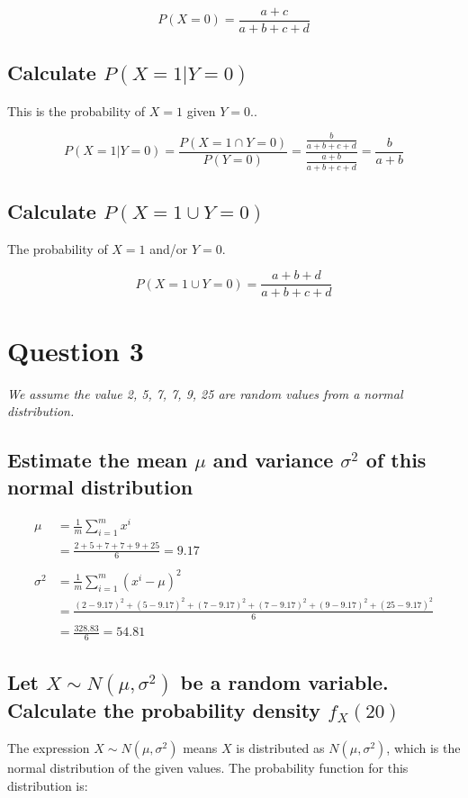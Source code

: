 \documentclass{article}
\begin{document}
	\begin{equation*}
	P(X=0) = \frac{a + c}{a+b+c+d}
	\end{equation*}
	
\subsection{Calculate $P(X=1|Y=0)$}
This is the probability of $X=1$ given $Y=0$..
	
	\begin{equation*}
	P(X=1|Y=0) = \frac{P(X=1 \cap Y=0)}{P(Y=0)}= \frac{\frac{b}{a+b+c+d}}{\frac{a+b}{a+b+c+d}} = \frac{b}{a+b}
	\end{equation*}
	
\subsection{Calculate $P(X=1 \cup Y=0)$}
The probability of $X=1$ and/or $Y=0$.

	\begin{equation*}
	P(X=1 \cup Y=0) = \frac{a+b+d}{a+b+c+d}
	\end{equation*}

\pagebreak
\section{Question 3}
\textit{We assume the value 2, 5, 7, 7, 9, 25 are random values from a normal distribution.}

\subsection{Estimate the mean $\mu$ and variance $\sigma^2$ of this normal distribution}
	
	\begin{align*}
	\mu &= \frac{1}{m}\sum\limits_{i=1}^m x^i \\
	 &= \frac{2+5+7+7+9+25}{6} = 9.17 \\ \\
	\sigma^2 &= \frac{1}{m}\sum\limits_{i=1}^m(x^i-\mu)^2\\
	&= \frac{(2-9.17)^2 + (5-9.17)^2 + (7-9.17)^2 + (7-9.17)^2 + (9-9.17)^2 + (25-9.17)^2}{6}\\
	&= \frac{328.83}{6} = 54.81
	\end{align*}

\subsection{Let $X \sim N(\mu,\sigma^2)$ be a random variable. Calculate the probability density $f_X(20)$}
The expression $X \sim N(\mu,\sigma^2)$ means $X$ is distributed as $ N(\mu,\sigma^2)$, which is the normal distribution of the given values. The probability function for this distribution is:
\end{document}
